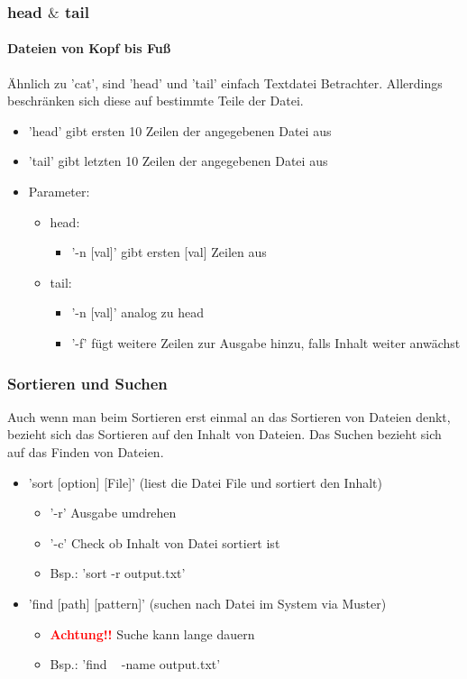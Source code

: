 \documentclass[12pt,utf8, handout]{beamer}
\begin{document}
\begin{frame}
\frametitle{head $\&$ tail}
\framesubtitle{\textcolor{ownDarkOr}{Dateien von Kopf bis Fuß}}
Ähnlich zu 'cat', sind 'head' und 'tail' einfach Textdatei Betrachter. Allerdings beschränken sich diese auf bestimmte Teile der Datei.
\begin{itemize}
	\item 'head' gibt ersten 10 Zeilen der angegebenen Datei aus
	\item 'tail' gibt letzten 10 Zeilen der angegebenen Datei aus
	\item Parameter:
	\begin{itemize}
		\item head:
		\begin{itemize}[<+->]
			\item '-n [val]' gibt ersten [val] Zeilen aus 
		\end{itemize}
		\item tail:
		\begin{itemize}[<+->]
			\item '-n [val]' analog zu head
			\item '-f' fügt weitere Zeilen zur Ausgabe hinzu, falls Inhalt weiter anwächst
		\end{itemize}
	\end{itemize}
\end{itemize}
\end{frame}

\begin{frame}
\frametitle{Sortieren und Suchen}
Auch wenn man beim Sortieren erst einmal an das Sortieren von Dateien denkt,
bezieht sich das Sortieren auf den Inhalt von Dateien.
Das Suchen bezieht sich auf das Finden von Dateien.
\begin{itemize}[<+->]
	\item 'sort [option] [File]' (liest die Datei File und sortiert den Inhalt)
	\begin{itemize}[<+->]
		\item '-r' Ausgabe umdrehen
		\item '-c' Check ob Inhalt von Datei sortiert ist
		\item Bsp.: 'sort -r output.txt'
	\end{itemize}
	\item 'find [path] [pattern]' (suchen nach Datei im System via Muster)
	\begin{itemize}[<+->]
		\item \textbf{\textcolor{red}{Achtung!!}} Suche kann lange dauern
		\item Bsp.: 'find ~ -name output.txt'
	\end{itemize}
\end{itemize}
\end{frame}
\end{document}
